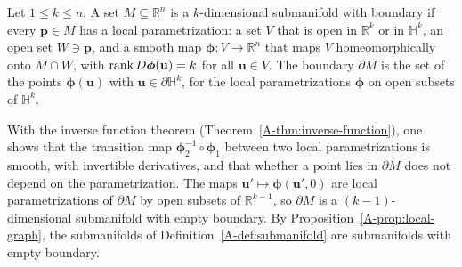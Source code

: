 \begin{definition}\label{A-def:manifold-boundary}
    Let $1 \leq k \leq n$. A set $M \subseteq \mathbb{R}^n$ is a $k$-dimensional submanifold with boundary if every $\mathbf{p} \in M$ has a local parametrization: a set $V$ that is open in $\mathbb{R}^k$ or in $\mathbb{H}^k$, an open set $W \ni \mathbf{p}$, and a smooth map $\boldsymbol{\phi}: V \to \mathbb{R}^n$ that maps $V$ homeomorphically onto $M \cap W$, with $\operatorname{rank} D\boldsymbol{\phi}(\mathbf{u}) = k$ for all $\mathbf{u} \in V$. The boundary $\partial M$ is the set of the points $\boldsymbol{\phi}(\mathbf{u})$ with $\mathbf{u} \in \partial\mathbb{H}^k$, for the local parametrizations $\boldsymbol{\phi}$ on open subsets of $\mathbb{H}^k$.
\end{definition}

With the inverse function theorem (Theorem~\ref{A-thm:inverse-function}), one shows that the transition map $\boldsymbol{\phi}_2^{-1} \circ \boldsymbol{\phi}_1$ between two local parametrizations is smooth, with invertible derivatives, and that whether a point lies in $\partial M$ does not depend on the parametrization. The maps $\mathbf{u}' \mapsto \boldsymbol{\phi}(\mathbf{u}', 0)$ are local parametrizations of $\partial M$ by open subsets of $\mathbb{R}^{k-1}$, so $\partial M$ is a $(k - 1)$-dimensional submanifold with empty boundary. By Proposition~\ref{A-prop:local-graph}, the submanifolds of Definition~\ref{A-def:submanifold} are submanifolds with empty boundary.

